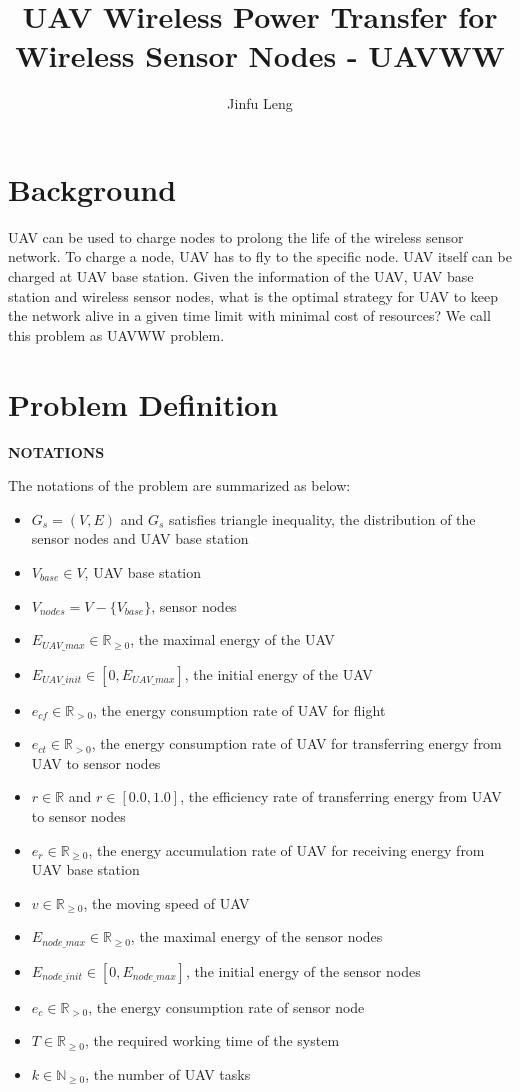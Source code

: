 \documentclass[11pt]{article}
\begin{document}
\title{UAV Wireless Power Transfer for Wireless Sensor Nodes - UAVWW}
\author{Jinfu Leng}
\maketitle
\section{Background}
UAV can be used to charge nodes to prolong the life of the wireless sensor network. To charge a node, UAV has to fly to the specific node. UAV itself can be charged at UAV base station. Given the information of the UAV, UAV base station and wireless sensor nodes, what is the optimal strategy for UAV to keep the network alive in a given time limit with minimal cost of resources? We call this problem as UAVWW problem.

\section{Problem Definition}
\textbf{NOTATIONS}

The notations of the problem are summarized as below:
\begin{itemize}[noitemsep]
\item $G_s = (V, E)$ and $G_s$ satisfies triangle inequality, the distribution of the sensor nodes and UAV base station
\item $V_{base} \in V$, UAV base station
\item $V_{nodes} = V - \{V_{base}\}$, sensor nodes
\item $E_{UAV\_max} \in \mathbb{R}_{\geq0}$, the maximal energy of the UAV
\item $E_{UAV\_init} \in [0, E_{UAV\_max}]$, the initial energy of the UAV
\item $e_{cf} \in \mathbb{R}_{>0}$, the energy consumption rate of UAV for flight
\item $e_{ct} \in \mathbb{R}_{>0}$, the energy consumption rate of UAV for transferring energy from UAV to sensor nodes
\item $r \in \mathbb{R}$ and $r \in [0.0, 1.0]$, the efficiency rate of transferring energy from UAV to sensor nodes
\item $e_r \in \mathbb{R}_{\geq0}$, the energy accumulation rate of UAV for receiving energy from UAV base station
\item $v \in \mathbb{R}_{\geq0}$, the moving speed of UAV
\item $E_{node\_max} \in \mathbb{R}_{\geq0}$, the maximal energy of the sensor nodes
\item $E_{node\_init} \in [0, E_{node\_max}]$, the initial energy of the sensor nodes
\item $e_{c} \in \mathbb{R}_{>0}$, the energy consumption rate of sensor node
\item $T \in \mathbb{R}_{\geq0}$, the required working time of the system
\item $k \in \mathbb{N}_{\geq0}$, the number of UAV tasks
\end{itemize}
\end{document}

